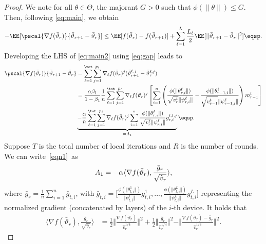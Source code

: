 \documentclass[nohyperref]{article}
\theoremstyle{plain}
\theoremstyle{definition}
\theoremstyle{remark}
\begin{document}
\begin{proof}
We note for all $\theta \in \Theta$, the majorant $G > 0$ such that $\phi(\|\theta \|) \leq G$. 
Then, following \eqref{eq:main}, we obtain
\begin{align}\label{eq:main2}
- \EE[  \pscal{\nabla f(\bar{\vartheta}_r)}{\bar{\vartheta}_{r+1} - \bar{\vartheta}_r}]  \leq  \EE[ f(\bar{\vartheta}_r) - f(\bar{\vartheta}_{r+1})] + \sum_{\ell =1}^L \frac{L_\ell}{2} \EE[  \| \bar{\vartheta}_{r+1} - \bar{\vartheta}_r \|^2] \eqsp.
\end{align}
Developing the LHS of \eqref{eq:main2} using \eqref{eq:gap} leads to
\begin{align} \notag
\pscal{\nabla f(\bar{\vartheta}_r)}{\bar{\vartheta}_{r+1} - \bar{\vartheta}_r} &= \sum_{\ell=1}^\tot \sum_{j=1}^{p_\ell} \nabla_{\ell} f(\bar{\vartheta}_r)^j (\bar{\vartheta}^{\ell,j}_{r+1} - \bar{\vartheta}^{\ell,j}_r)  \\ \notag
& =  \frac{\alpha \beta_1}{1-\beta_1}\frac{1}{n}  \sum_{\ell=1}^\tot \sum_{j=1}^{p_\ell} \nabla_{\ell} f(\bar{\vartheta}_r)^j \left[   \sum_{i = 1}^n  \left( \frac{\phi(\|\theta_{r,i}^{\ell}\|)}{\sqrt{v^{t}_{r}} \|\psi_{r,i}^{\ell}\|} - \frac{\phi(\|\theta_{r-1,i}^{\ell}\|)}{\sqrt{v^{t}_{r-1}} \|\psi_{r-1,i}^{\ell}\|} \right) m^{t}_{r-1}  \right] \\ \label{eqn1}
& \underbrace{ -\frac{\alpha}{n} \sum_{\ell=1}^\tot \sum_{j=1}^{p_\ell} \nabla_{\ell} f(\bar{\vartheta}_r)^j  \sum_{i = 1}^n \frac{\phi(\|\theta_{r,i}^{\ell}\|)}{\sqrt{v^{t}_{r}} \|\psi_{r,i}^{\ell}\|} g_{r,i}^{t,l,j}}_{= A_1}   \eqsp.
\end{align}
Suppose $T$ is the total number of local iterations and $R$ is the number of rounds. We can write~\eqref{eqn1}~as
\begin{align}\notag
    A_1=-\alpha \langle \nabla f(\bar \vartheta_r),\frac{\bar g_r}{\sqrt{\hat v_r}} \rangle,
\end{align}
where $\bar g_r=\frac{1}{n}\sum_{i=1}^n \bar g_{t,i}$, with $\bar g_{t,i}=\Big[\frac{\phi(\Vert \theta_{t,i}^1\Vert)}{\Vert \psi_{t,i}^1\Vert}g_{t,i}^1,..., \frac{\phi(\Vert \theta_{t,i}^L\Vert)}{\Vert \psi_{t,i}^L\Vert}g_{t,i}^L   \Big]$ representing the normalized gradient (concatenated by layers) of the $i$-th device. It holds that
\begin{align}
    \langle \nabla f(\bar \vartheta_r),\frac{\bar g_r}{\sqrt{\hat v_r}} \rangle&=\frac{1}{2}\Vert \frac{\nabla f(\bar\vartheta_r) }{\hat v_r^{1/4}}\Vert^2+\frac{1}{2}\Vert \frac{\bar g_r }{\hat v_r^{1/4}}\Vert^2-\Vert \frac{\nabla f(\bar\vartheta_r)-\bar g_r }{\hat v_r^{1/4}}\Vert^2.  \label{eqn:x1}
\end{align}



\end{proof}
\end{document}
